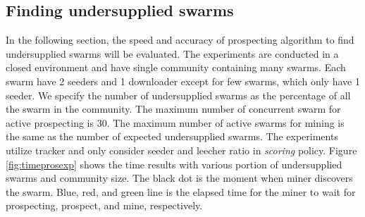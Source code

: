 \subsection{Finding undersupplied swarms}
In the following section, the speed and accuracy of prospecting algorithm to find undersupplied swarms will be evaluated. The experiments are conducted in a closed environment and have single community containing many swarms. Each swarm have 2 seeders and 1 downloader except for few swarms, which only have 1 seeder. We specify the number of undersupplied swarms as the percentage of all the swarm in the community. The maximum number of concurrent swarm for active prospecting is 30. The maximum number of active swarms for mining is the same as the number of expected undersupplied swarms. The experiments utilize tracker and only consider seeder and leecher ratio in \textit{scoring} policy. Figure \ref{fig:timeprosexp} shows the time results with various portion of undersupplied swarms and community size. The black dot is the moment when miner discovers the swarm. Blue, red, and green line is the elapsed time for the miner to wait for prospecting, prospect, and mine, respectively.

